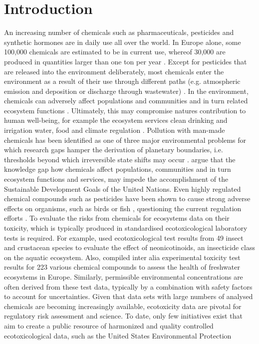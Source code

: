 \section*{Introduction}
An increasing number of chemicals such as pharmaceuticals, pesticides and synthetic hormones are in daily use all over the world. In Europe alone, some 100,000 chemicals are estimated to be in current use, whereof 30,000 are produced in quantities larger than one ton per year \citep{breithaupt_costs_2006}. Except for pesticides that are released into the environment deliberately, most chemicals enter the environment as a result of their use through different paths (e.g. atmospheric emission and deposition or discharge through wastewater) \citep{schwarzenbach_challenge_2006}. In the environment, chemicals can adversely affect populations and communities and in turn related ecosystem functions \citep{rhind_anthropogenic_2009, clements_community_2009, hallmann_declines_2014, barracaracciolo_pharmaceuticals_2015, johnston_review_2015, hallmann_more_2017, sanchez-bayo_worldwide_2019}. Ultimately, this may compromise natures contribution to human well-being, for example the ecosystem services clean drinking and irrigation water, food and climate regulation \citep{peters_review_2013, vandersluijs_neonicotinoids_2013, barracaracciolo_pharmaceuticals_2015, yamamuro_neonicotinoids_2019}. Pollution with man-made chemicals has been identified as one of three major environmental problems for which research gaps hamper the derivation of planetary boundaries, i.e. thresholds beyond which irreversible state shifts may occur \citep{steffen_anthropocene_2007, steffen_planetary_2015}. \citet{bernhardt_synthetic_2017} argue that the knowledge gap how chemicals affect populations, communities and in turn ecosystem functions and services, may impede the accomplishment of the Sustainable Development Goals of the United Nations. Even highly regulated chemical compounds such as pesticides have been shown to cause strong adverse effects on organisms, such as birds \citep{hallmann_declines_2014} or fish \citep{yamamuro_neonicotinoids_2019}, questioning the current regulation efforts \citep{schafer_future_2019}. To evaluate the risks from chemicals for ecosystems data on their toxicity, which is typically produced in standardised ecotoxicological laboratory tests is required. For example, \citet{morrissey_neonicotinoid_2015} used ecotoxicological test results from 49 insect and crustacean species to evaluate the effect of neonicotinoids, an insecticide class on the aquatic ecosystem. Also, \citet{malaj_organic_2014} compiled inter alia experimental toxicity test results for 223 various chemical compounds to assess the health of freshwater ecosystems in Europe. Similarly, permissible environmental concentrations are often derived from these test data, typically by a combination with safety factors to account for uncertainties. Given that data sets with large numbers of analysed chemicals are becoming increasingly available, ecotoxicity data are pivotal for regulatory risk assessment and science. To date, only few initiatives exist that aim to create a public resource of harmonized and quality controlled ecotoxicological data, such as the United States Environmental Protection 